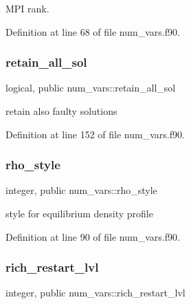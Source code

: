 M\+PI rank. 



Definition at line 68 of file num\+\_\+vars.\+f90.

\mbox{\label{namespacenum__vars_adc6255c76bb27f763817adc8e2d80658}} 
\subsubsection{\texorpdfstring{retain\+\_\+all\+\_\+sol}{retain\_all\_sol}}
{\footnotesize\ttfamily logical, public num\+\_\+vars\+::retain\+\_\+all\+\_\+sol}



retain also faulty solutions 



Definition at line 152 of file num\+\_\+vars.\+f90.

\mbox{\label{namespacenum__vars_a787c23d10a522ff93cf555587b71cc0d}} 
\subsubsection{\texorpdfstring{rho\+\_\+style}{rho\_style}}
{\footnotesize\ttfamily integer, public num\+\_\+vars\+::rho\+\_\+style}



style for equilibrium density profile 



Definition at line 90 of file num\+\_\+vars.\+f90.

\mbox{\label{namespacenum__vars_ac4bc885e8034c285bf0a9b76a832a738}} 
\subsubsection{\texorpdfstring{rich\+\_\+restart\+\_\+lvl}{rich\_restart\_lvl}}
{\footnotesize\ttfamily integer, public num\+\_\+vars\+::rich\+\_\+restart\+\_\+lvl}



